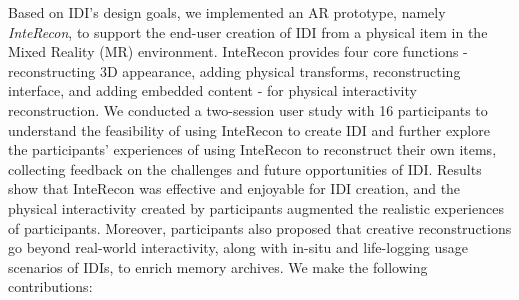 
Based on IDI's design goals, we implemented an AR prototype, namely \textit{InteRecon}, to support the end-user creation of IDI from a physical item in the Mixed Reality (MR) environment. 
InteRecon provides four core functions - reconstructing 3D appearance, adding physical transforms, reconstructing interface, and adding embedded content - for physical interactivity reconstruction. 
We conducted a two-session user study with 16 participants to understand the feasibility of using InteRecon to create IDI and further explore the participants’ experiences of using InteRecon to reconstruct their own items, collecting feedback on the challenges and future opportunities of IDI.
Results show that InteRecon was effective and enjoyable for IDI creation, and the physical interactivity created by participants augmented the realistic experiences of participants. Moreover, participants also proposed that creative reconstructions go beyond real-world interactivity, along with in-situ and life-logging usage scenarios of IDIs, to enrich memory archives. 
We make the following contributions:
